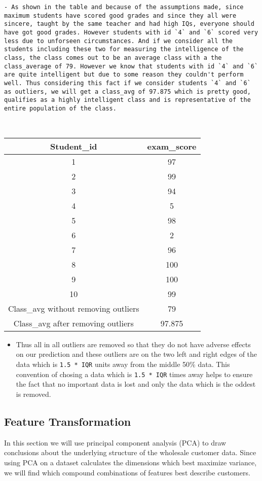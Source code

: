 \documentclass[11pt]{article}
\providecommand{\tightlist}{%
      \setlength{\itemsep}{0pt}\setlength{\parskip}{0pt}}
\begin{document}
\begin{verbatim}
- As shown in the table and because of the assumptions made, since maximum students have scored good grades and since they all were sincere, taught by the same teacher and had high IQs, everyone should have got good grades. However students with id `4` and `6` scored very less due to unforseen circumstances. And if we consider all the students including these two for measuring the intelligence of the class, the class comes out to be an average class with a the class_average of 79. However we know that students with id `4` and `6` are quite intelligent but due to some reason they couldn't perform well. Thus considering this fact if we consider students `4` and `6` as outliers, we will get a class_avg of 97.875 which is pretty good, qualifies as a highly intelligent class and is representative of the entire population of the class.
    
    
\end{verbatim}

\begin{longtable}[]{@{}cc@{}}
\toprule
Student\_id & exam\_score\tabularnewline
\midrule
\endhead
1 & 97\tabularnewline
2 & 99\tabularnewline
3 & 94\tabularnewline
4 & 5\tabularnewline
5 & 98\tabularnewline
6 & 2\tabularnewline
7 & 96\tabularnewline
8 & 100\tabularnewline
9 & 100\tabularnewline
10 & 99\tabularnewline
Class\_avg without removing outliers & 79\tabularnewline
Class\_avg after removing outliers & 97.875\tabularnewline
\bottomrule
\end{longtable}

\begin{itemize}
\tightlist
\item
  Thus all in all outliers are removed so that they do not have adverse
  effects on our prediction and these outliers are on the two left and
  right edges of the data which is \texttt{1.5\ *\ IQR} units away from
  the middle 50\% data. This convention of chosing a data which is
  \texttt{1.5\ *\ IQR} times away helps to ensure the fact that no
  important data is lost and only the data which is the oddest is
  removed.
\end{itemize}

    \subsection{Feature Transformation}\label{feature-transformation}

In this section we will use principal component analysis (PCA) to draw
conclusions about the underlying structure of the wholesale customer
data. Since using PCA on a dataset calculates the dimensions which best
maximize variance, we will find which compound combinations of features
best describe customers.
\end{document}
